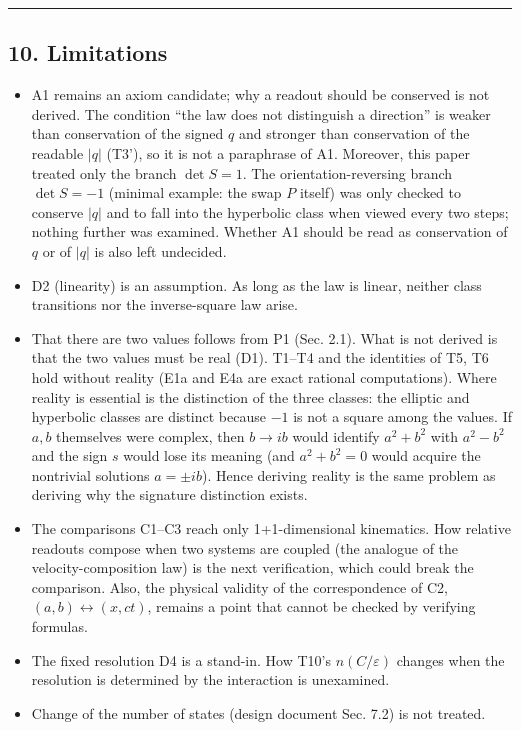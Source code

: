 \documentclass[
  a4paper,
]{article}
\providecommand{\tightlist}{%
  \setlength{\itemsep}{0pt}\setlength{\parskip}{0pt}}
\begin{document}
\begin{center}\rule{0.5\linewidth}{0.5pt}\end{center}

\subsection{10. Limitations}\label{limitations}

\begin{itemize}
\tightlist
\item
  A1 remains an axiom candidate; why a readout should be conserved is
  not derived. The condition ``the law does not distinguish a
  direction'' is weaker than conservation of the signed \(q\) and
  stronger than conservation of the readable \(\lvert q\rvert\) (T3'),
  so it is not a paraphrase of A1. Moreover, this paper treated only the
  branch \(\det S=1\). The orientation-reversing branch \(\det S=-1\)
  (minimal example: the swap \(P\) itself) was only checked to conserve
  \(\lvert q\rvert\) and to fall into the hyperbolic class when viewed
  every two steps; nothing further was examined. Whether A1 should be
  read as conservation of \(q\) or of \(\lvert q\rvert\) is also left
  undecided.
\item
  D2 (linearity) is an assumption. As long as the law is linear, neither
  class transitions nor the inverse-square law arise.
\item
  That there are two values follows from P1 (Sec. 2.1). What is not
  derived is that the two values must be real (D1). T1--T4 and the
  identities of T5, T6 hold without reality (E1a and E4a are exact
  rational computations). Where reality is essential is the distinction
  of the three classes: the elliptic and hyperbolic classes are distinct
  because \(-1\) is not a square among the values. If \(a,b\) themselves
  were complex, then \(b\to ib\) would identify \(a^2+b^2\) with
  \(a^2-b^2\) and the sign \(s\) would lose its meaning (and
  \(a^2+b^2=0\) would acquire the nontrivial solutions \(a=\pm ib\)).
  Hence deriving reality is the same problem as deriving why the
  signature distinction exists.
\item
  The comparisons C1--C3 reach only 1+1-dimensional kinematics. How
  relative readouts compose when two systems are coupled (the analogue
  of the velocity-composition law) is the next verification, which could
  break the comparison. Also, the physical validity of the
  correspondence of C2, \((a,b)\leftrightarrow(x,ct)\), remains a point
  that cannot be checked by verifying formulas.
\item
  The fixed resolution D4 is a stand-in. How T10's \(n(C/\varepsilon)\)
  changes when the resolution is determined by the interaction is
  unexamined.
\item
  Change of the number of states (design document Sec. 7.2) is not
  treated.
\end{itemize}
\end{document}
